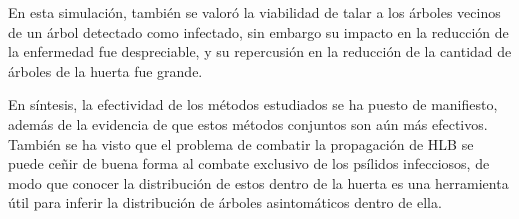 En esta simulación, también se valoró la viabilidad de talar a los árboles vecinos de un árbol detectado como infectado, sin embargo su impacto en la reducción de la enfermedad fue despreciable, y su repercusión en la reducción de la cantidad de árboles de la huerta fue grande.
	
En síntesis, la efectividad de los métodos estudiados se ha puesto de manifiesto, además de la evidencia de que estos métodos conjuntos son aún más efectivos. También se ha visto que el problema de combatir la propagación de HLB se puede ceñir de buena forma al combate exclusivo de los psílidos infecciosos, de modo que conocer la distribución de estos dentro de la huerta es una herramienta útil para inferir la distribución de árboles asintomáticos dentro de ella.


